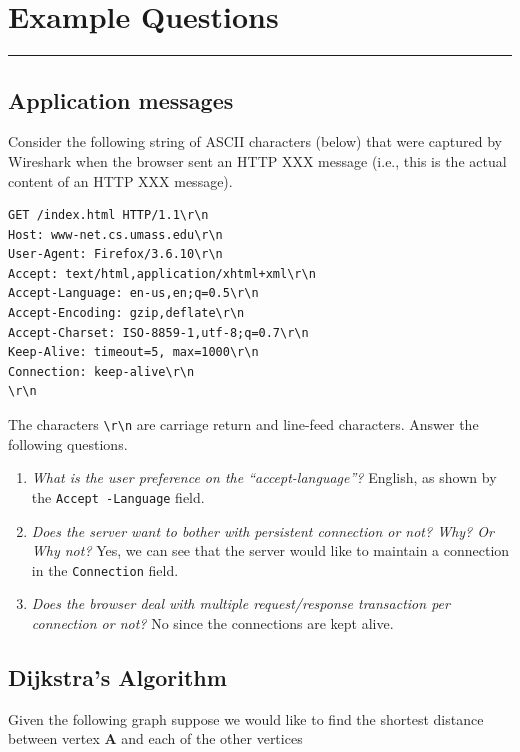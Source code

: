 \documentclass{article}
\begin{document}
\newpage

\section*{Example Questions}
\noindent
\rule{\linewidth}{0.5mm}
\noindent

\subsection*{Application messages}
Consider the following string of ASCII characters (below) that were captured by Wireshark when the browser sent an HTTP XXX message (i.e., this is the actual content of an HTTP XXX message).
\begin{lstlisting}
GET /index.html HTTP/1.1\r\n
Host: www-net.cs.umass.edu\r\n
User-Agent: Firefox/3.6.10\r\n
Accept: text/html,application/xhtml+xml\r\n
Accept-Language: en-us,en;q=0.5\r\n
Accept-Encoding: gzip,deflate\r\n
Accept-Charset: ISO-8859-1,utf-8;q=0.7\r\n
Keep-Alive: timeout=5, max=1000\r\n
Connection: keep-alive\r\n
\r\n
\end{lstlisting}
The characters \texttt{\textbackslash r\textbackslash n} are carriage return and line-feed characters. Answer the following questions.

\begin{enumerate}
    \item {\it What is the user preference on the “accept-language”?} English, as shown by the \texttt{Accept -Language} field.
    \item {\it Does the server want to bother with persistent connection or not? Why? Or Why not?} Yes, we can see that the server would like to maintain a connection in the \texttt{Connection} field.
    \item {\it Does the browser deal with multiple request/response transaction per connection or not?} No since the connections are kept alive.
\end{enumerate}

\subsection*{Dijkstra's Algorithm}
Given the following graph suppose we would like to find the shortest distance between vertex {\bf A} and each of the other vertices
\end{document}
